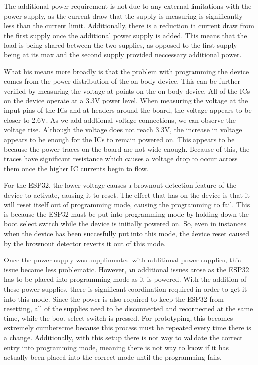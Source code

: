 The additional power requirement is not due to any external limitations with the power supply,
as the current draw that the supply is measuring is significantly less than the current limit.
Additionally, there is a reduction in current draw from the first supply once the additional power supply is added.
This means that the load is being shared between the two supplies,
as opposed to the first supply being at its max and the second supply provided neccessary additional power.

What his means more broadly is that the problem with programming the device comes from the power distribution of the on-body device.
This can be further verified by measuring the voltage at points on the on-body device.
All of the ICs on the device operate at a 3.3V power level.
When measuring the voltage at the input pins of the ICs and at headers around the board, the voltage appears to be closer to 2.6V.
As we add addtional voltage connections, we can observe the voltage rise.
Although the voltage does not reach 3.3V, the increase in voltage appears to be enough for the ICs to remain powered on.
This appears to be because the power traces on the board are not wide enough.
Because of this, the traces have significant resistance which causes a voltage drop to occur across them once the higher IC currents begin to flow.

For the ESP32, the lower voltage causes a brownout detection feature of the device to activate, causing it to reset.
The effect that has on the device is that it will reset itself out of programming mode, causing the programming to fail.
This is because the ESP32 must be put into programming mode by holding down the boot select switch while the device is initially powered on.
So, even in instances when the device has been succesfully put into this mode,
the device reset caused by the brownout detector reverts it out of this mode.

Once the power supply was supplimented with additional power supplies, this issue became less problematic.
However, an additional issues arose as the ESP32 has to be placed into programming mode as it is powered.
With the addition of these power supplies, there is significant coordination required in order to get it into this mode.
Since the power is also required to keep the ESP32 from resetting, all of the supplies need to be disconnected and reconnected at the same time,
while the boot select switch is pressed.
For prototyping, this becomes extremely cumbersome because this process must be repeated every time there is a change.
Additionally, with this setup there is not way to validate the correct entry into programming mode,
meaning there is not way to know if it has actually been placed into the correct mode until the programming fails.

